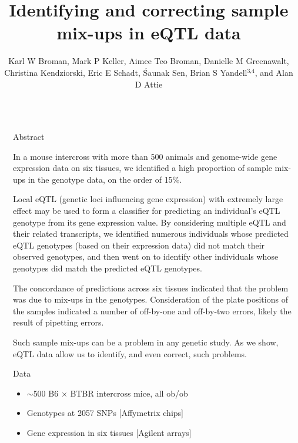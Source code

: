 \documentclass[final,plain]{beamer}
\title{Identifying and correcting sample mix-ups in eQTL data}
\author{Karl W Broman\footnotemark[1], Mark P Keller\footnotemark[2],
  Aimee Teo Broman\footnotemark[1], Danielle M Greenawalt\footnotemark[5], \\[18pt] 
  Christina Kendziorski\footnotemark[1], Eric E Schadt\footnotemark[6], 
\'Saunak Sen\footnotemark[7], Brian S Yandell$^{\text{3,4}}$, and Alan D Attie\footnotemark[2]}
\institute{\footnotemark[1]{\normalsize Biostatistics and
  Medical Informatics},
\footnotemark[2]{\normalsize Biochemistry},
\footnotemark[3]{\normalsize Statistics},
\footnotemark[4]{\normalsize Horticulture, UW-Madison};
\footnotemark[5]{\normalsize Merck \& Co., Inc.};
\footnotemark[6]{\normalsize Pacific Biosciences};
\footnotemark[7]{\normalsize UC--San Francisco}
}
\newlength{\sepwid}
\newlength{\onecolwid}
\begin{document}
\begin{frame}[t]

\begin{columns}[t]								
  \begin{column}{\sepwid}\end{column}                 %
  
  \begin{column}{\onecolwid}
\begin{exampleblock}{\Large Abstract}
  {In a mouse intercross with more than 500 animals and genome-wide gene
expression data on six tissues, we identified a high proportion of
sample mix-ups in the genotype data, on the order of {\color{nred} 15\%}.  

\vspace{18pt}

Local eQTL (genetic loci influencing gene expression) with extremely
large effect may be used to form a classifier for predicting an
individual's eQTL genotype from its gene expression value.  By
considering multiple eQTL and their related transcripts, we identified
numerous individuals whose predicted eQTL genotypes (based on their
expression data) did not match their observed genotypes, and then went
on to identify other individuals whose genotypes did match the
predicted eQTL genotypes.  

\vspace{18pt}

The concordance of predictions across six tissues indicated that the
problem was due to mix-ups in the genotypes.  Consideration of the
plate positions of the samples indicated a number of off-by-one and
off-by-two errors, likely the result of pipetting errors.  

\vspace{18pt}

Such sample mix-ups can be a problem in any genetic study. As we show,
eQTL data allow us to identify, and even correct, such problems.  }
\end{exampleblock}

\vspace{45mm} %

    \begin{block}{Data}
      \begin{itemize}
        \itemsep18pt
        \item $\sim$500 B6 $\times$ BTBR intercross mice, all ob/ob
        \item Genotypes at 2057 SNPs [Affymetrix chips]
        \item Gene expression in six tissues [Agilent arrays]


\end{itemize}
\end{block}
\end{column}
\end{columns}
\end{frame}
\end{document}
